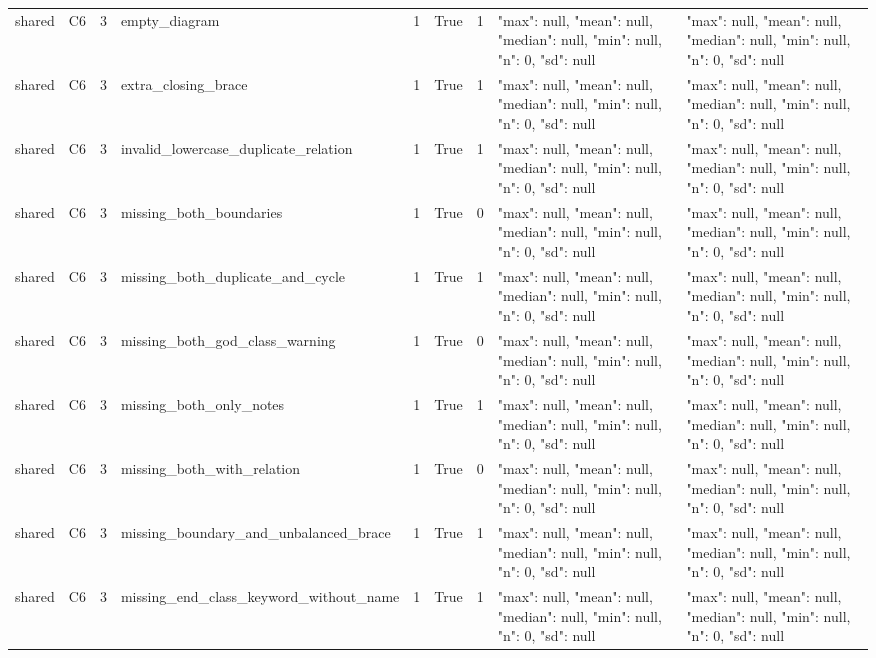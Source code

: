\begin{tabular}{lllllllll}
shared & C6 & 3 & empty\_diagram & 1 & True & 1 & {"max": null, "mean": null, "median": null, "min": null, "n": 0, "sd": null} & {"max": null, "mean": null, "median": null, "min": null, "n": 0, "sd": null} \\
shared & C6 & 3 & extra\_closing\_brace & 1 & True & 1 & {"max": null, "mean": null, "median": null, "min": null, "n": 0, "sd": null} & {"max": null, "mean": null, "median": null, "min": null, "n": 0, "sd": null} \\
shared & C6 & 3 & invalid\_lowercase\_duplicate\_relation & 1 & True & 1 & {"max": null, "mean": null, "median": null, "min": null, "n": 0, "sd": null} & {"max": null, "mean": null, "median": null, "min": null, "n": 0, "sd": null} \\
shared & C6 & 3 & missing\_both\_boundaries & 1 & True & 0 & {"max": null, "mean": null, "median": null, "min": null, "n": 0, "sd": null} & {"max": null, "mean": null, "median": null, "min": null, "n": 0, "sd": null} \\
shared & C6 & 3 & missing\_both\_duplicate\_and\_cycle & 1 & True & 1 & {"max": null, "mean": null, "median": null, "min": null, "n": 0, "sd": null} & {"max": null, "mean": null, "median": null, "min": null, "n": 0, "sd": null} \\
shared & C6 & 3 & missing\_both\_god\_class\_warning & 1 & True & 0 & {"max": null, "mean": null, "median": null, "min": null, "n": 0, "sd": null} & {"max": null, "mean": null, "median": null, "min": null, "n": 0, "sd": null} \\
shared & C6 & 3 & missing\_both\_only\_notes & 1 & True & 1 & {"max": null, "mean": null, "median": null, "min": null, "n": 0, "sd": null} & {"max": null, "mean": null, "median": null, "min": null, "n": 0, "sd": null} \\
shared & C6 & 3 & missing\_both\_with\_relation & 1 & True & 0 & {"max": null, "mean": null, "median": null, "min": null, "n": 0, "sd": null} & {"max": null, "mean": null, "median": null, "min": null, "n": 0, "sd": null} \\
shared & C6 & 3 & missing\_boundary\_and\_unbalanced\_brace & 1 & True & 1 & {"max": null, "mean": null, "median": null, "min": null, "n": 0, "sd": null} & {"max": null, "mean": null, "median": null, "min": null, "n": 0, "sd": null} \\
shared & C6 & 3 & missing\_end\_class\_keyword\_without\_name & 1 & True & 1 & {"max": null, "mean": null, "median": null, "min": null, "n": 0, "sd": null} & {"max": null, "mean": null, "median": null, "min": null, "n": 0, "sd": null} \\

\end{tabular}
